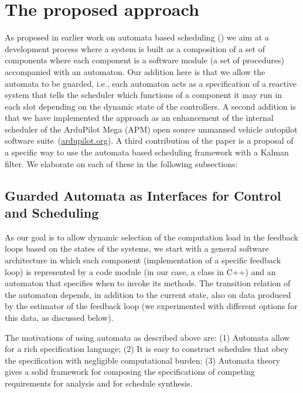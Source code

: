 \documentclass{sig-alternate-ipsn13}
\begin{document}
\section{The proposed approach}
\label{sec:architecture}

As proposed in earlier work on automata based scheduling (\cite{weiss2007automata,RTComposer,AW08}) we aim at a development process where a system is built as a composition of a set of components where each component is a software module (a set of procedures) accompanied with an automaton. Our addition here is that we allow the automata to be guarded, i.e., each automaton acts as a specification of a reactive system that tells the scheduler which functions of a component it may run in each slot depending on the dynamic state of the controllers. A second addition is that we have implemented the approach as an enhancement of the internal scheduler of the ArduPilot Mega (APM) open source unmanned vehicle autopilot software suite~(\url{ardupilot.org}). A third contribution of the paper is a proposal of a specific way to use the automata based scheduling framework with a Kalman filter. We elaborate on each of these in the following subsections:

\subsection{Guarded Automata as Interfaces for Control and Scheduling}
As our goal is to allow dynamic selection of the computation load in the feedback loops based on the states of the systems, we start with a general software architecture in which each component (implementation of a specific feedback loop) is represented by a code module (in our case, a class in C++) and an automaton that specifies when to invoke its methods. The transition relation of the automaton depends, in addition to the current state, also on data produced by the estimator of the feedback loop (we experimented with different options for this data, as discussed below).

The motivations of using automata as described above are: (1) Automata allow for a rich specification language; (2) It is easy to construct schedules that obey the specification with negligible computational burden; (3) Automata theory gives a solid framework for composing the specifications of competing requirements for analysis and for schedule synthesis. 
\end{document}
